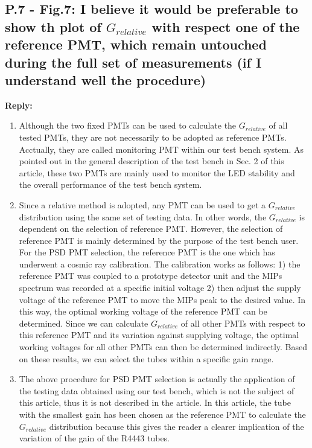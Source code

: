 \documentclass[]{article}
\begin{document}
\subsection{ P.7 - Fig.7: I believe it would be preferable to show th plot of $G_{relative}$ with respect one of the reference PMT, which remain untouched during the full set of measurements (if I understand well the procedure)}
\textbf{Reply:}
\begin{enumerate}
	\item Although the two fixed PMTs can be used to calculate the $G_{relative}$ of all tested PMTs, they are not necessarily to be adopted as reference PMTs.  Acctually, they are called monitoring PMT  within our test bench system. As pointed out in the general description of the test bench in Sec. 2 of this article, these two PMTs are mainly used to monitor the LED stability and the overall performance of the test bench system. 
	\item Since a relative method is adopted, any PMT can be used to get a $G_{relative}$ distribution using the same set of testing data. In other words, the $G_{relative}$ is dependent on the selection of reference PMT. However, the selection of reference PMT is mainly determined by the purpose of the test bench user. For the PSD PMT selection, the reference  PMT is the one which has underwent a cosmic ray calibration. The calibration works as follows: 1) the reference PMT was coupled to a prototype detector unit and the MIPs spectrum was recorded at a specific initial voltage 2) then adjust the supply voltage of the reference PMT  to move the MIPs peak to the desired value. In this way, the optimal working voltage of the reference PMT can be determined. Since we can calculate $G_{relative}$ of all other PMTs with respect to this reference PMT and its variation against supplying voltage, the optimal working voltages for all other PMTs can then be determined indirectly. Based on these results, we can select the tubes within a specific gain range.
	\item The above procedure for  PSD PMT selection is actually the application of the testing data obtained using our test bench, which is not the subject of this article, thus it is not described in the article. In this article, the tube with the smallest gain has been chosen as the reference PMT to calculate the $G_{relative}$ distribution because this gives the reader a clearer implication of the variation of the gain of the R4443 tubes.
\end{enumerate}
\end{document}
